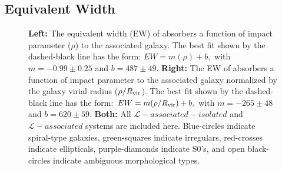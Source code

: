\documentclass[twocolumn,tighten]{aastex62}
\begin{document}
\subsection{Equivalent Width}

\begin{figure}[ht!]
        \centering
        \vspace{0pt}
        \caption{\small{\textbf{Left: } The equivalent width (EW) of absorbers a function of impact parameter ($\rho$) to the associated galaxy. The best fit shown by the dashed-black line has the form: $EW = m (\rho) + b,$ with $m = -0.99 \pm 0.25$ and $b = 487 \pm 49$. \textbf{Right:} The EW of absorbers a function of impact parameter to the associated galaxy normalized by the galaxy virial radius ($\rho / R_{\rm vir}$). The best fit shown by the dashed-black line has the form: $EW = m (\rho / R_{\rm vir}) + b,$ with $m = -265 \pm 48$ and $b = 620 \pm 59$. \textbf{Both:} All $\mathcal{L}-associated-isolated$ and $\mathcal{L}-associated$ systems are included here. Blue-circles indicate spiral-type galaxies, green-squares indicate irregulars, red-crosses indicate ellipticals, purple-diamonds indicate S0's, and open black-circles indicate ambiguous morphological types. }}
        \vspace{5pt}
        \label{ew_both}
\end{figure}
\end{document}

